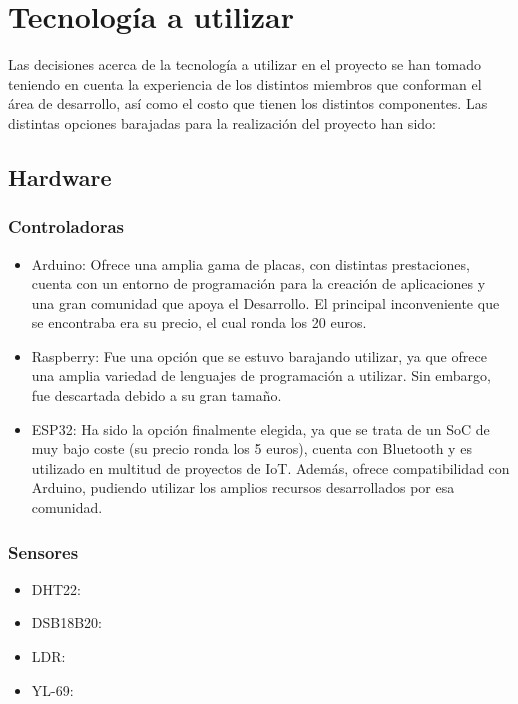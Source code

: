 \documentclass[runningheads]{llncs}
\begin{document}
\section{Tecnología a utilizar}
Las decisiones acerca de la tecnología a utilizar en el proyecto se han tomado teniendo en cuenta la experiencia de los distintos miembros que conforman el área de desarrollo, así como el costo que tienen los distintos componentes.
\newline
Las distintas opciones barajadas para la realización del proyecto han sido:

\subsection*{Hardware}
\subsubsection*{Controladoras}
\begin{itemize}
    \item Arduino: Ofrece una amplia gama de placas, con distintas prestaciones, cuenta con un entorno de programación para la creación de aplicaciones y una gran comunidad que apoya el Desarrollo. El principal inconveniente que se encontraba era su precio, el cual ronda los 20 euros.
    
    \item Raspberry: Fue una opción que se estuvo barajando utilizar, ya que ofrece una amplia variedad de lenguajes de programación a utilizar. Sin embargo, fue descartada debido a su gran tamaño.
    
    \item ESP32: Ha sido la opción finalmente elegida, ya que se trata de un SoC de muy bajo coste (su precio ronda los 5 euros), cuenta con Bluetooth y es utilizado en multitud de proyectos de IoT. Además, ofrece compatibilidad con Arduino, pudiendo utilizar los amplios recursos desarrollados por esa comunidad.
\end{itemize}

\subsubsection*{Sensores}
\begin{itemize}
    \item DHT22:
    \item DSB18B20:
    \item LDR:
    \item YL-69:
\end{itemize}
\end{document}
